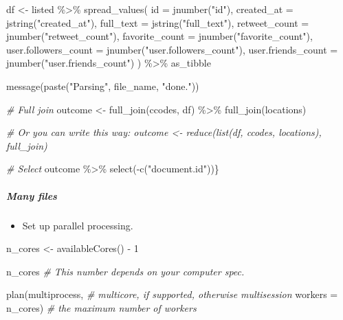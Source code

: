 \documentclass[
]{book}
\newenvironment{Shaded}{\begin{snugshade}}{\end{snugshade}}
\newcommand{\AttributeTok}[1]{\textcolor[rgb]{0.77,0.63,0.00}{#1}}
\newcommand{\CommentTok}[1]{\textcolor[rgb]{0.56,0.35,0.01}{\textit{#1}}}
\newcommand{\DecValTok}[1]{\textcolor[rgb]{0.00,0.00,0.81}{#1}}
\newcommand{\FunctionTok}[1]{\textcolor[rgb]{0.00,0.00,0.00}{#1}}
\newcommand{\NormalTok}[1]{#1}
\newcommand{\OtherTok}[1]{\textcolor[rgb]{0.56,0.35,0.01}{#1}}
\newcommand{\SpecialCharTok}[1]{\textcolor[rgb]{0.00,0.00,0.00}{#1}}
\newcommand{\StringTok}[1]{\textcolor[rgb]{0.31,0.60,0.02}{#1}}
\providecommand{\tightlist}{%
  \setlength{\itemsep}{0pt}\setlength{\parskip}{0pt}}
\begin{document}
\begin{Shaded}
\begin{Highlighting}[]
\NormalTok{df }\OtherTok{\textless{}{-}}\NormalTok{ listed }\SpecialCharTok{\%\textgreater{}\%}
  \FunctionTok{spread\_values}\NormalTok{(}
    \AttributeTok{id =} \FunctionTok{jnumber}\NormalTok{(}\StringTok{"id"}\NormalTok{),}
    \AttributeTok{created\_at =} \FunctionTok{jstring}\NormalTok{(}\StringTok{"created\_at"}\NormalTok{),}
    \AttributeTok{full\_text =} \FunctionTok{jstring}\NormalTok{(}\StringTok{"full\_text"}\NormalTok{),}
    \AttributeTok{retweet\_count =} \FunctionTok{jnumber}\NormalTok{(}\StringTok{"retweet\_count"}\NormalTok{),}
    \AttributeTok{favorite\_count =} \FunctionTok{jnumber}\NormalTok{(}\StringTok{"favorite\_count"}\NormalTok{),}
    \AttributeTok{user.followers\_count =} \FunctionTok{jnumber}\NormalTok{(}\StringTok{"user.followers\_count"}\NormalTok{),}
    \AttributeTok{user.friends\_count =} \FunctionTok{jnumber}\NormalTok{(}\StringTok{"user.friends\_count"}\NormalTok{)}
\NormalTok{  ) }\SpecialCharTok{\%\textgreater{}\%}
\NormalTok{      as\_tibble}

\FunctionTok{message}\NormalTok{(}\FunctionTok{paste}\NormalTok{(}\StringTok{"Parsing"}\NormalTok{, file\_name, }\StringTok{"done."}\NormalTok{))}

\CommentTok{\# Full join}
\NormalTok{outcome }\OtherTok{\textless{}{-}} \FunctionTok{full\_join}\NormalTok{(ccodes, df) }\SpecialCharTok{\%\textgreater{}\%} \FunctionTok{full\_join}\NormalTok{(locations)}

\CommentTok{\# Or you can write this way: outcome \textless{}{-} reduce(list(df, ccodes, locations), full\_join)}

\CommentTok{\# Select}
\NormalTok{outcome }\SpecialCharTok{\%\textgreater{}\%} \FunctionTok{select}\NormalTok{(}\SpecialCharTok{{-}}\FunctionTok{c}\NormalTok{(}\StringTok{"document.id"}\NormalTok{))\}}
\end{Highlighting}
\end{Shaded}

\hypertarget{many-files}{%
\subparagraph{Many files}\label{many-files}}

\begin{itemize}
\tightlist
\item
  Set up parallel processing.
\end{itemize}

\begin{Shaded}
\begin{Highlighting}[]
\NormalTok{n\_cores }\OtherTok{\textless{}{-}} \FunctionTok{availableCores}\NormalTok{() }\SpecialCharTok{{-}} \DecValTok{1}

\NormalTok{n\_cores }\CommentTok{\# This number depends on your computer spec.}

\FunctionTok{plan}\NormalTok{(multiprocess, }\CommentTok{\# multicore, if supported, otherwise multisession}
     \AttributeTok{workers =}\NormalTok{ n\_cores) }\CommentTok{\# the maximum number of workers}
\end{Highlighting}
\end{Shaded}
\end{document}
